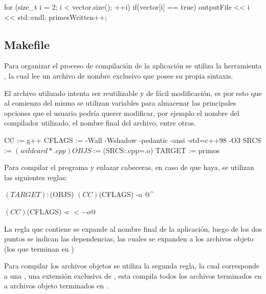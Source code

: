 \documentclass[12pt]{article}
\newenvironment{fullgrayverb}
{\verbbox}
{\endverbbox\par\colorbox{gray!25}{\parbox{\textwidth}{\theverbbox}}\par}
\begin{document}
\begin{fullgrayverb}[\mbox{}]
for (size_t i = 2; i < vector.size(); ++i) {
    if(vector[i] == true) {
        outputFile << i << std::endl;
        primesWritten++;
    }
}
\end{fullgrayverb}

\subsection{Makefile}


Para organizar el proceso de compilación de la aplicación se utiliza la
herramienta , la cual lee un archivo de nombre exclusivo
 que posee su propia sintaxis.

El archivo  utilizado intenta ser reutilizable y de fácil
modificación, es por esto que al comienzo del mismo se utilizan variables para
almacenar las principales opciones que el usuario podría querer modificar, por
ejemplo el nombre del compilador utilizado, el nombre final del archivo, entre
otras.

\begin{fullgrayverb}[\mbox{}]
CC := g++
CFLAGS := -Wall -Wshadow -pedantic -ansi -std=c++98 -O3
SRCS := $(wildcard *.cpp)
OBJS := $(SRCS:.cpp=.o)
TARGET := primos
\end{fullgrayverb}

Para compilar el programa y enlazar cabeceras, en caso de que haya, se utilizan
las siguientes reglas:

\begin{fullgrayverb}[\mbox{}]
$(TARGET): $(OBJS)
    $(CC) $(CFLAGS) -o $@ $^

    $(CC) $(CFLAGS) -c $< -o $@
\end{fullgrayverb}

La regla que contiene  se expande al nombre final de la
aplicación, luego de los dos puntos se indican las dependencias, las cuales se
expanden a los archivos objeto (los que terminan en )

Para compilar los archivos objetos se utiliza la segunda regla, la cual
corresponde a una , una extensión exclusiva de , 
esta  compila todos los archivos terminados en  a
archivos objeto terminados en .
\end{document}
